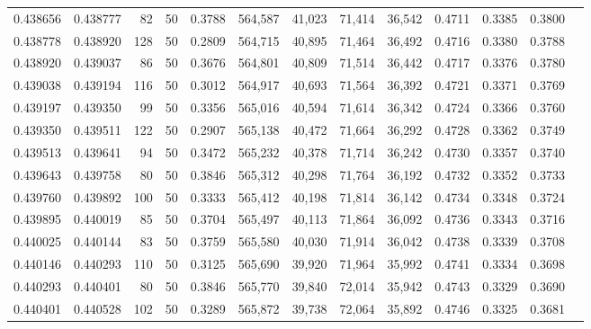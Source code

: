 \begin{tabular}{rrrrrrrrrrrrr}
0.438656 & 0.438777 &    82 &  50 &                                     0.3788 & 564,587 &  41,023 &  71,414 &  36,542 & 0.4711 & 0.3385 & 0.3800 \\
0.438778 & 0.438920 &   128 &  50 &                                     0.2809 & 564,715 &  40,895 &  71,464 &  36,492 & 0.4716 & 0.3380 & 0.3788 \\
0.438920 & 0.439037 &    86 &  50 &                                     0.3676 & 564,801 &  40,809 &  71,514 &  36,442 & 0.4717 & 0.3376 & 0.3780 \\
0.439038 & 0.439194 &   116 &  50 &                                     0.3012 & 564,917 &  40,693 &  71,564 &  36,392 & 0.4721 & 0.3371 & 0.3769 \\
0.439197 & 0.439350 &    99 &  50 &                                     0.3356 & 565,016 &  40,594 &  71,614 &  36,342 & 0.4724 & 0.3366 & 0.3760 \\
0.439350 & 0.439511 &   122 &  50 &                                     0.2907 & 565,138 &  40,472 &  71,664 &  36,292 & 0.4728 & 0.3362 & 0.3749 \\
0.439513 & 0.439641 &    94 &  50 &                                     0.3472 & 565,232 &  40,378 &  71,714 &  36,242 & 0.4730 & 0.3357 & 0.3740 \\
0.439643 & 0.439758 &    80 &  50 &                                     0.3846 & 565,312 &  40,298 &  71,764 &  36,192 & 0.4732 & 0.3352 & 0.3733 \\
0.439760 & 0.439892 &   100 &  50 &                                     0.3333 & 565,412 &  40,198 &  71,814 &  36,142 & 0.4734 & 0.3348 & 0.3724 \\
0.439895 & 0.440019 &    85 &  50 &                                     0.3704 & 565,497 &  40,113 &  71,864 &  36,092 & 0.4736 & 0.3343 & 0.3716 \\
0.440025 & 0.440144 &    83 &  50 &                                     0.3759 & 565,580 &  40,030 &  71,914 &  36,042 & 0.4738 & 0.3339 & 0.3708 \\
0.440146 & 0.440293 &   110 &  50 &                                     0.3125 & 565,690 &  39,920 &  71,964 &  35,992 & 0.4741 & 0.3334 & 0.3698 \\
0.440293 & 0.440401 &    80 &  50 &                                     0.3846 & 565,770 &  39,840 &  72,014 &  35,942 & 0.4743 & 0.3329 & 0.3690 \\
0.440401 & 0.440528 &   102 &  50 &                                     0.3289 & 565,872 &  39,738 &  72,064 &  35,892 & 0.4746 & 0.3325 & 0.3681 \\

\end{tabular}
